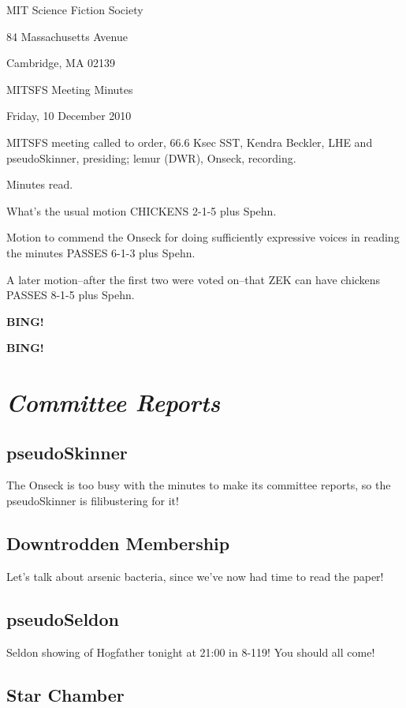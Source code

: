 \documentclass[10pt]{article}
\newcommand{\bing}{{\bf BING!} }
\newcommand{\goto}[1]{\bing \vskip 12pt \section*{{\em{#1}}}}
\newcommand{\ps}{ plus Spehn\xspace}
\newcommand{\skinner}{Kendra Beckler, LHE and pseudoSkinner}
\newcommand{\onseck}{lemur (DWR), Onseck}
\newcommand{\meetingdate}{Friday, 10 December 2010}
\begin{document}
\begin{center}

MIT Science Fiction Society

84 Massachusetts Avenue

Cambridge, MA 02139

\vspace{12pt}

MITSFS Meeting Minutes

\meetingdate

\end{center}

\vspace{18pt}

\setlength{\parskip}{6pt}

\noindent
MITSFS meeting called to order, 66.6 Ksec SST,
\skinner, presiding; \onseck, recording.

Minutes read.

What's the usual motion CHICKENS 2-1-5\ps.

Motion to commend the Onseck for doing sufficiently expressive voices
in reading the minutes PASSES 6-1-3\ps.

A later motion--after the first two were voted on--that ZEK can have
chickens PASSES 8-1-5\ps.

\bing

\goto{Committee Reports}

\subsection*{pseudoSkinner}

The Onseck is too busy with the minutes to make its committee reports,
so the pseudoSkinner is filibustering for it!

\subsection*{Downtrodden Membership}

Let's talk about arsenic bacteria, since we've now had time to read the paper!

\subsection*{pseudoSeldon}

Seldon showing of Hogfather tonight at 21:00 in 8-119!  You should all come!

\subsection*{Star Chamber}
\end{document}
